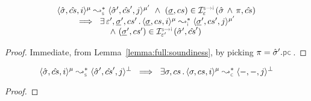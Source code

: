 \begin{lemma}
$$
\begin{array}{l}
\transabssemrule{\sstate, \scs, i}{\sstate', \scs', j}{\mode}{\mode'}{\symbolic}  
    \ \wedge \ (\istate, \cs) \in \interpret{\symbinst}{\senv}(\sstate \, \wedge \, \pc, \scs) \\ \quad \quad 
    \ \implies \ \exists \, \senv', \istate', \cs' \, . \, 
        \transabssemrule{\istate, \cs, i}{\istate', \cs', j}{\mode}{\mode'}{\instrumented} \\ \quad \quad  \quad \quad \quad \quad 
               \ \wedge \ (\istate', \cs') \in \interpret{\symbinst}{\senv'}(\sstate', \scs')
\end{array}
$$
\end{lemma}
\begin{proof}
Immediate, from Lemma~\ref{lemma:full:soundiness}, by picking $\pc = \sstate'.\pcsel$.
\end{proof}

%
\begin{cormax}
$$
\transabssemrule{\sstate, \scs, i}{\sstate', \scs', j}{\mode}{\bot}{\symbolic}  
      \ \implies \  \exists \jstate, \cs \, . \, \transabssemrule{\jstate, \cs, i}{-, -, j}{\mode}{\bot}{\concrete}  
$$
\end{cormax}
\begin{proof}
%
%
\end{proof}

